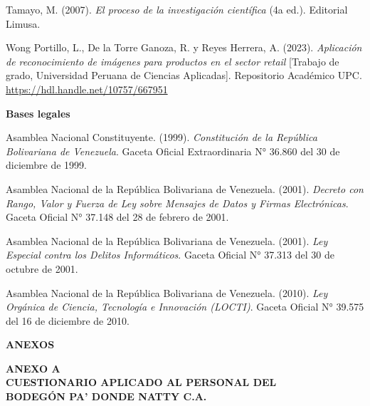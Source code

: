 \documentclass[12pt, letterpaper]{report}
\begin{document}
Tamayo, M. (2007). \textit{El proceso de la investigación científica}
(4a ed.). Editorial Limusa.

Wong Portillo, L., De la Torre Ganoza, R. y Reyes Herrera, A. (2023).
\textit{Aplicación de reconocimiento de imágenes para productos en el
sector retail} [Trabajo de grado, Universidad Peruana de Ciencias
Aplicadas]. Repositorio Académico UPC.
\url{https://hdl.handle.net/10757/667951}

\vspace{12pt}
\textbf{Bases legales}
\vspace{6pt}

Asamblea Nacional Constituyente. (1999). \textit{Constitución de la
República Bolivariana de Venezuela}. Gaceta Oficial Extraordinaria
N° 36.860 del 30 de diciembre de 1999.

Asamblea Nacional de la República Bolivariana de Venezuela. (2001).
\textit{Decreto con Rango, Valor y Fuerza de Ley sobre Mensajes de
Datos y Firmas Electrónicas}. Gaceta Oficial N° 37.148 del 28 de
febrero de 2001.

Asamblea Nacional de la República Bolivariana de Venezuela. (2001).
\textit{Ley Especial contra los Delitos Informáticos}. Gaceta Oficial
N° 37.313 del 30 de octubre de 2001.

Asamblea Nacional de la República Bolivariana de Venezuela. (2010).
\textit{Ley Orgánica de Ciencia, Tecnología e Innovación (LOCTI)}.
Gaceta Oficial N° 39.575 del 16 de diciembre de 2010.

\setlength{\parindent}{1.25cm}
\setlength{\parskip}{0pt}

\clearpage
{}
\begin{center}
\vspace*{2cm}
{\fontsize{16}{20}\selectfont\bfseries ANEXOS\par}
\end{center}

\clearpage
\begin{center}
{\fontsize{14}{16}\selectfont\bfseries
ANEXO A\\
CUESTIONARIO APLICADO AL PERSONAL DEL\\
BODEGÓN PA' DONDE NATTY C.A.\par}
\end{center}
\vspace{12pt}
\end{document}
